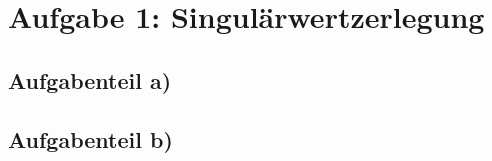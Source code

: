 \section*{Aufgabe 1: Singulärwertzerlegung}

\subsection*{Aufgabenteil a)}

\subsection*{Aufgabenteil b)}
